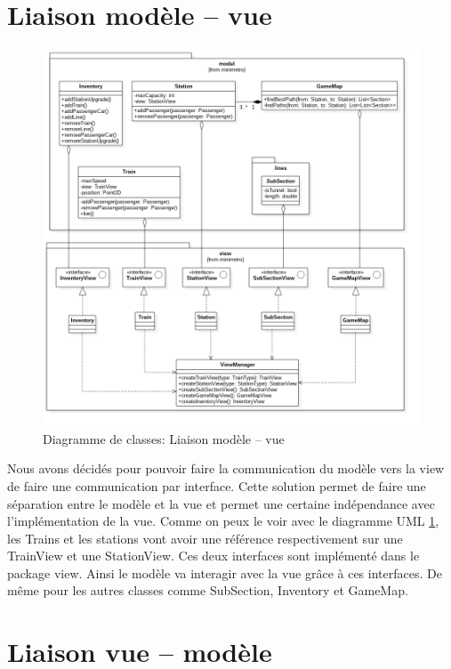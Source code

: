 \documentclass[report, backcover, french, nodocumentinfo]{upmethodology-document}
\begin{document}
		\section{Liaison modèle -- vue}
			\begin{figure}[h!]
				\centering
				\includegraphics[width=\textwidth]{figures/ModelViewLinkClassDiagram}
				\caption{Diagramme de classes: Liaison modèle -- vue}
				\label{fig:ModelViewLinkClassDiagram}
			\end{figure}
				Nous avons décidés pour pouvoir faire la communication du modèle vers la view de faire une communication par interface. Cette solution permet de faire une séparation entre le modèle et la vue et permet une certaine indépendance avec l'implémentation de la vue.
				Comme on peux le voir avec le diagramme UML \ref{fig:ModelViewLinkClassDiagram}, les Trains et les stations vont avoir une référence respectivement sur une TrainView et une StationView. Ces deux interfaces sont implémenté dans le package view. Ainsi le modèle va interagir avec la vue grâce à ces interfaces. De même pour les autres classes comme SubSection, Inventory et GameMap.
		\section{Liaison vue -- modèle}
\end{document}
